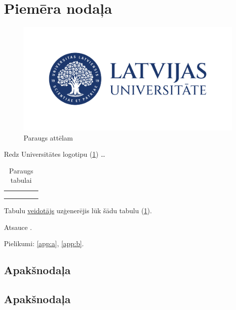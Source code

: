 \section{Piemēra nodaļa}

\blindtext

\begin{figure}[h]
    \centering
    \includegraphics[scale=0.1]{images/LU_logotips_LAT_horiz.jpg}
    \caption{Paraugs attēlam}
    \label{fig:lu}
\end{figure}

Redz Universitātes logotipu (\ref{fig:lu}) \dots

\begin{table}[h]
    \centering
    \begin{tabular}{|l|l|l|l|l|}
        \hline
         &  &  &  & \\ \hline
         &  &  &  & \\ \hline
         &  &  &  & \\ \hline
         &  &  &  & \\ \hline
    \end{tabular}
    \caption{Paraugs tabulai}
    \label{tbl:ex}
\end{table}

Tabulu \href{https://www.tablesgenerator.com/}{veidotājs} uzģenerējis lūk šādu tabulu (\ref{tbl:ex}).

Atsauce \cite{knuthwebsite,knuth-fa}.

Pielikumi: \ref{app:a}, \ref{app:b}.

\subsection{Apakšnodaļa}

\blindtext

\subsection{Apakšnodaļa}

\blindtext

\Blinddocument
